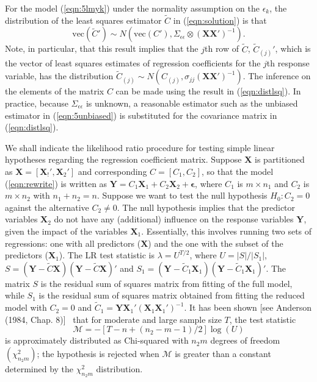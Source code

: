 \begin{result}\label{res:1}
For the model (\ref{eqn:5lmyk}) under the normality assumption on the $\epsilon_k$,  the distribution of the least squares estimator $\tilde{C}$ in (\ref{eqn:solution}) is that 
	\begin{equation}\label{eqn:distlsq}
	\text{vec}(\tilde{C}') \sim N(\text{vec}(C'), \Sigma_{\epsilon\epsilon} \otimes (\mathbf{X} \mathbf{X}')^{-1}).
	\end{equation}
Note, in particular, that this result implies that the $j$th row of $\tilde{C}$, $\tilde{C}_{(j)}'$, which is the vector of least squares estimates of regression coefficients for the $j$th response variable, has the distribution $\tilde{C}_{(j)} \sim N(C_{(j)}, \sigma_{jj}(\mathbf{X}\mathbf{X}')^{-1})$. The inference on the elements of the matrix $C$ can be made using the result in (\ref{eqn:distlsq}). In practice, because $\Sigma_{\epsilon\epsilon}$ is unknown, a reasonable estimator such as the unbiased estimator in (\ref{eqn:5unbiased}) is substituted for the covariance matrix in (\ref{eqn:distlsq}).


We shall indicate the likelihood ratio procedure for testing simple linear hypotheses regarding the regression coefficient matrix. Suppose $\mathbf{X}$ is partitioned as $\mathbf{X}=[\mathbf{X}_!', \mathbf{X}_2']$ and corresponding $C=[C_1,C_2]$, so that the model (\ref{eqn:rewrite}) is written as $\mathbf{Y}=C_1 \mathbf{X}_1+C_2 \mathbf{X}_2+\mathbf{\epsilon}$, where $C_1$ is $m\times n_1$ and $C_2$ is $m \times n_2$ with $n_1+n_2=n$. Suppose we want to test the null hypothesis $H_0: C_2=0$ against the alternative $C_2 \neq 0$. The null hypothesis implies that the predictor variables $\mathbf{X}_2$ do not have any (additional) influence on the response variables $\mathbf{Y}$, given the impact of the variables $\mathbf{X}_1$. Essentially, this involves running two sets of regressions: one with all predictors ($\mathbf{X}$) and the one with the subset of the predictors ($\mathbf{X}_1$). The LR test statistic is $\lambda=U^{T/2}$, where $U=|S|/|S_1|$, $S=(\mathbf{Y}-\tilde{C}\mathbf{X})(\mathbf{Y}-\tilde{C}\mathbf{X})'$ and $S_1=(\mathbf{Y}-\tilde{C}_1\mathbf{X}_1)(\mathbf{Y}-\tilde{C}_1\mathbf{X}_1)'$. The matrix $S$ is the residual sum of squares matrix from fitting of the full model, while $S_1$ is the residual sum of squares matrix obtained from fitting the reduced model with $C_2=0$ and $\tilde{C}_1=\mathbf{Y}\mathbf{X}_1'(\mathbf{X}_1\mathbf{X}_1')^{-1}$. It has been shown [see Anderson (1984, Chap. 8)]~\cite{andersontw2} that for moderate and large sample size $T$, the test statistic 
	\begin{equation}\label{eqn:mathcal}
	\mathcal{M}=-[T-n+(n_2-m-1)/2] \log(U)
	\end{equation}
is approximately distributed as Chi-squared with $n_2m$ degrees of freedom $(\chi_{n_2m}^2)$; the hypothesis is rejected when $\mathcal{M}$ is greater than a constant determined by the $\chi_{n_2m}^2$ distribution. 
\end{result}


